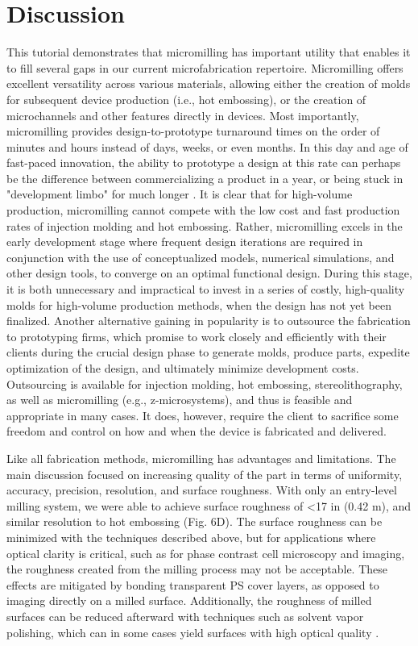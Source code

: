 \section{Discussion}
This tutorial demonstrates that micromilling has important utility that enables it to fill several gaps in our current microfabrication repertoire. Micromilling offers excellent versatility across various materials, allowing either the creation of molds for subsequent device production (i.e., hot embossing), or the creation of microchannels and other features directly in devices. Most importantly, micromilling provides design-to-prototype turnaround times on the order of minutes and hours instead of days, weeks, or even months. In this day and age of fast-paced innovation, the ability to prototype a design at this rate can perhaps be the difference between commercializing a product in a year, or being stuck in "development limbo" for much longer \cite{Chin2012}. It is clear that for high-volume production, micromilling cannot compete with the low cost and fast production rates of injection molding and hot embossing. Rather, micromilling excels in the early development stage where frequent design iterations are required in conjunction with the use of conceptualized models, numerical simulations, and other design tools, to converge on an optimal functional design. During this stage, it is both unnecessary and impractical to invest in a series of costly, high-quality molds for high-volume production methods, when the design has not yet been finalized. Another alternative gaining in popularity is to outsource the fabrication to prototyping firms, which promise to work closely and efficiently with their clients during the crucial design phase to generate molds, produce parts, expedite optimization of the design, and ultimately minimize development costs. Outsourcing is available for injection molding, hot embossing, stereolithography, as well as micromilling (e.g., z-microsystems), and thus is feasible and appropriate in many cases. It does, however, require the client to sacrifice some freedom and control on how and when the device is fabricated and delivered. 

Like all fabrication methods, micromilling has advantages and limitations. The main discussion focused on increasing quality of the part in terms of uniformity, accuracy, precision, resolution, and surface roughness. With only an entry-level milling system, we were able to achieve surface roughness of <17 \textmu in (0.42 \textmu m), and similar resolution to hot embossing (Fig. 6D). The surface roughness can be minimized with the techniques described above, but for applications where optical clarity is critical, such as for phase contrast cell microscopy and imaging, the roughness created from the milling process may not be acceptable. These effects are mitigated by bonding transparent PS cover layers, as opposed to imaging directly on a milled surface. Additionally, the roughness of milled surfaces can be reduced afterward with techniques such as solvent vapor polishing, which can in some cases yield surfaces with high optical quality \cite{Ogilvie2010}.

